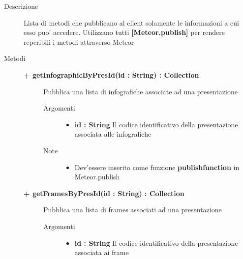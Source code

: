 \begin{description}
\item[Descrizione] \hfill
	Lista di metodi che pubblicano al client solamente le informazioni a cui esso puo' accedere. Utilizzano tutti  \textbf{[Meteor.publish]} per rendere reperibili i metodi attraverso Meteor

	
	
\item[Metodi] \hfill
	
	\begin{description}
		\item[\textbf{\color{blue}+ getInfographicByPresId(id : String) : Collection			}] \hfill
			Pubblica una lista di infografiche associate ad una presentazione
			
		\begin{description}
			\item[Argomenti] \hfill
				\begin{itemize}
				
					\item \textbf{id : String			} \hfill
					Il codice identificativo della presentazione associata alle infografiche
					
				\end{itemize}
			\item[Note] \hfill
			\begin{itemize}
					\item Dev'essere inserito come funzione \textbf{publishfunction} in Meteor.publish
				\end{itemize}
		\end{description}
	\end{description}
	
	\begin{description}
		\item[\textbf{\color{blue}+ getFramesByPresId(id : String) : Collection			}] \hfill
			Pubblica una lista di frames associati ad una presentazione
			
		\begin{description}
			\item[Argomenti] \hfill
				\begin{itemize}
				
					\item \textbf{id : String			} \hfill
					Il codice identificativo della presentazione associata ai frame
					

\end{itemize}
\end{description}
\end{description}
\end{description}
